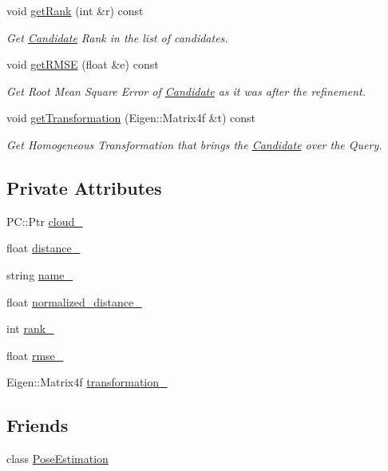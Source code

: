 \begin{DoxyCompactItemize}
void \hyperlink{classCandidate_ad66fdb55b874a43a6bd09ac64fb78931}{get\-Rank} (int \&r) const 
\begin{DoxyCompactList}\small\item\em Get \hyperlink{classCandidate}{Candidate} Rank in the list of candidates. \end{DoxyCompactList}\item 
void \hyperlink{classCandidate_a7edea7828ccbc682d177f8a060a93d8c}{get\-R\-M\-S\-E} (float \&e) const 
\begin{DoxyCompactList}\small\item\em Get Root Mean Square Error of \hyperlink{classCandidate}{Candidate} as it was after the refinement. \end{DoxyCompactList}\item 
void \hyperlink{classCandidate_ae5669e4112e92fcb119c2a06cc8904c0}{get\-Transformation} (Eigen\-::\-Matrix4f \&t) const 
\begin{DoxyCompactList}\small\item\em Get Homogeneous Transformation that brings the \hyperlink{classCandidate}{Candidate} over the Query. \end{DoxyCompactList}\end{DoxyCompactItemize}
\subsection*{Private Attributes}
\begin{DoxyCompactItemize}
\item 
P\-C\-::\-Ptr \hyperlink{classCandidate_a76f70de142b2d01bf2e5fa8243dd9b2f}{cloud\-\_\-}
\item 
float \hyperlink{classCandidate_a4c57f77041f7729849ff4acf86071abf}{distance\-\_\-}
\item 
string \hyperlink{classCandidate_a2d2bca2f29137c8d341202d4d4e3aa04}{name\-\_\-}
\item 
float \hyperlink{classCandidate_a03bdc19e0ee68d095ef402c1ae8857e6}{normalized\-\_\-distance\-\_\-}
\item 
int \hyperlink{classCandidate_a671df007d258250715bfa7f80df4162c}{rank\-\_\-}
\item 
float \hyperlink{classCandidate_a1794f08bfc0b49287159c85034b23654}{rmse\-\_\-}
\item 
Eigen\-::\-Matrix4f \hyperlink{classCandidate_ac6dd9ee10ce1bf011b1005cfa239cc7b}{transformation\-\_\-}
\end{DoxyCompactItemize}
\subsection*{Friends}
\begin{DoxyCompactItemize}
\item 
class \hyperlink{classCandidate_acc93828d970ba58835be2e8221c7a669}{Pose\-Estimation}
\end{DoxyCompactItemize}



